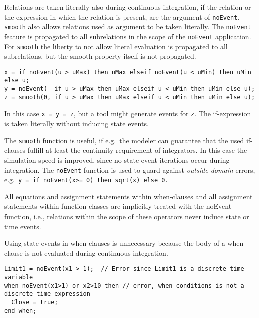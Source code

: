Relations are taken literally also during continuous integration, if the
relation or the expression in which the relation is present, are the
argument of \lstinline!noEvent!. \lstinline!smooth! also
allows relations used as argument to be taken literally. The \lstinline!noEvent!
feature is propagated to all subrelations in the scope of the \lstinline!noEvent!
application. For \lstinline!smooth! the liberty to not allow literal evaluation is
propagated to all subrelations, but the smooth-property itself is not
propagated.

\begin{example}
\begin{lstlisting}[language=modelica]
x = if noEvent(u > uMax) then uMax elseif noEvent(u < uMin) then uMin else u;
y = noEvent(  if u > uMax then uMax elseif u < uMin then uMin else u);
z = smooth(0, if u > uMax then uMax elseif u < uMin then uMin else u);
\end{lstlisting}

In this case \lstinline!x = y = z!, but a tool might generate events for \lstinline!z!. The
if-expression is taken literally without inducing state events.

The \lstinline!smooth! function is useful, if e.g.\ the modeler can guarantee that
the used if-clauses fulfill at least the continuity requirement of
integrators. In this case the simulation speed is improved, since no
state event iterations occur during integration. The \lstinline!noEvent! function is
used to guard against \emph{outside domain} errors, e.g.\ \lstinline!y = if noEvent(x>= 0) then sqrt(x) else 0.!
\end{example}

All equations and assignment statements within when-clauses and all
assignment statements within function classes are implicitly treated
with the noEvent function, i.e., relations within the scope of these
operators never induce state or time events.

\begin{nonnormative}
Using state events in when-clauses is unnecessary because the body of a when-clause is not evaluated during continuous integration.
\end{nonnormative}

\begin{example}
\begin{lstlisting}[language=modelica]
Limit1 = noEvent(x1 > 1);  // Error since Limit1 is a discrete-time variable
when noEvent(x1>1) or x2>10 then // error, when-conditions is not a discrete-time expression
  Close = true;
end when;
\end{lstlisting}
\end{example}

